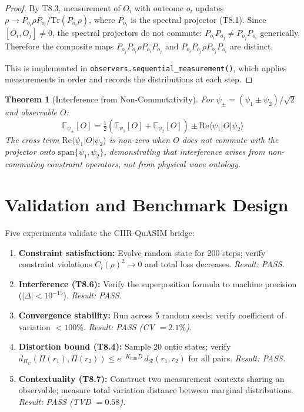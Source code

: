 \documentclass[11pt,a4paper]{article}
\newtheorem{theorem}[definition]{Theorem}
\newcommand{\CR}{\mathcal{R}}
\newcommand{\HC}{H_C}
\newcommand{\Tr}{\mathrm{Tr}}
\begin{document}
\begin{proof}
By T8.3, measurement of $O_i$ with outcome $o_i$ updates
$\rho \to P_{o_i} \rho P_{o_i} / \Tr(P_{o_i} \rho)$, where
$P_{o_i}$ is the spectral projector (T8.1).  Since $[O_i, O_j]
\neq 0$, the spectral projectors do not commute:
$P_{o_i} P_{o_j} \neq P_{o_j} P_{o_i}$ generically.
Therefore the composite maps $P_{o_j} P_{o_i} \rho P_{o_i} P_{o_j}$
and $P_{o_i} P_{o_j} \rho P_{o_j} P_{o_i}$ are distinct.

This is implemented in \texttt{observers.sequential\_measurement()},
which applies measurements in order and records the distributions at
each step.
\end{proof}

\begin{theorem}[Interference from Non-Commutativity]
\label{thm:interference}
For $\psi_\pm = (\psi_1 \pm \psi_2)/\sqrt{2}$ and observable $O$:
\[
  \mathbb{E}_{\psi_\pm}[O] = \tfrac{1}{2}(\mathbb{E}_{\psi_1}[O]
    + \mathbb{E}_{\psi_2}[O]) \pm \mathrm{Re}\langle \psi_1 | O | \psi_2 \rangle
\]
The cross term $\mathrm{Re}\langle \psi_1 | O | \psi_2 \rangle$ is
non-zero when $O$ does not commute with the projector onto
$\mathrm{span}\{\psi_1, \psi_2\}$, demonstrating that interference
arises from \emph{non-commuting constraint operators}, not from
physical wave ontology.
\end{theorem}

\section{Validation and Benchmark Design}
\label{sec:validation}

Five experiments validate the CIIR-QuASIM bridge:

\begin{enumerate}
  \item \textbf{Constraint satisfaction:} Evolve random state for 200
    steps; verify constraint violations $C_i(\rho)^2 \to 0$ and
    total loss decreases.  \emph{Result: PASS.}

  \item \textbf{Interference (T8.6):} Verify the superposition formula
    to machine precision ($|\Delta| < 10^{-15}$).  \emph{Result: PASS.}

  \item \textbf{Convergence stability:} Run across 5 random seeds;
    verify coefficient of variation $< 100\%$.  \emph{Result: PASS
    (CV $= 2.1\%$).}

  \item \textbf{Distortion bound (T8.4):} Sample 20 ontic states;
    verify $d_{\HC}(\Pi(r_1), \Pi(r_2)) \leq e^{-K_{\min} D}\,
    d_{\CR}(r_1, r_2)$ for all pairs.  \emph{Result: PASS.}

  \item \textbf{Contextuality (T8.7):} Construct two measurement
    contexts sharing an observable; measure total variation distance
    between marginal distributions.  \emph{Result: PASS (TVD $= 0.58$).}
\end{enumerate}
\end{document}
